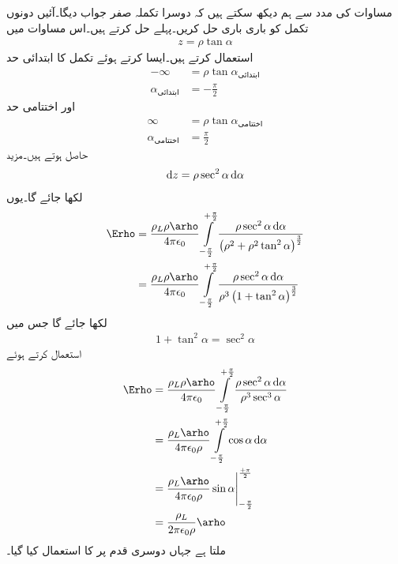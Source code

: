 مساوات  کی مدد سے ہم دیکھ سکتے ہیں کہ دوسرا تکملہ صفر جواب دیگا۔آئیں دونوں تکمل کو باری باری حل کریں۔پہلے \Erho حل کرتے ہیں۔اس مساوات میں
\begin{align*}
z=\rho \tan \alpha
\end{align*}
استعمال کرتے ہیں۔ایسا کرتے ہوئے تکمل کا ابتدائی حد 
\begin{align*}
-\infty &= \rho \tan \alpha_{\textrm{ابتدائی}}\\
\alpha_{\textrm{ابتدائی}} &= -\frac{\pi}{2}
\end{align*}
اور اختتامی حد
\begin{align*}
\infty &= \rho \tan \alpha_{\textrm{اختتامی}}\\
\alpha_{\textrm{اختتامی}} &= \frac{\pi}{2}
\end{align*}
حاصل ہوتے ہیں۔مزید
\begin{align*}
\dif z=\rho \sec^2 \alpha \dif \alpha
\end{align*}
لکھا جائے گا۔یوں
\begin{align*}
\Erho&=\frac{\rho_L \rho \arho}{4 \pi \epsilon_0}\int\limits_{-\frac{\pi}{2}}^{+\frac{\pi}{2}} \frac{\rho \sec^2 \alpha \dif \alpha}{\left(\rho^2+\rho^2 \tan^2 \alpha \right)^{\frac{3}{2}}}\\
&=\frac{\rho_L \rho \arho}{4 \pi \epsilon_0}\int\limits_{-\frac{\pi}{2}}^{+\frac{\pi}{2}} \frac{\rho \sec^2 \alpha \dif \alpha}{\rho^3 \left(1+ \tan^2 \alpha \right)^{\frac{3}{2}}}
\end{align*}
لکھا جائے گا جس میں
\begin{align*}
1+\tan^2 \alpha=\sec^2 \alpha
\end{align*}
استعمال کرتے ہوئے
\begin{gather}
\begin{aligned}\label{مساوات_کولمب_لامحدود_لکیر_رداسی_میدان}
\Erho&=\frac{\rho_L \rho \arho}{4 \pi \epsilon_0}\int\limits_{-\frac{\pi}{2}}^{+\frac{\pi}{2}} \frac{\rho \sec^2 \alpha \dif \alpha}{\rho^3 \sec^3 \alpha}\\
&=\frac{\rho_L  \arho}{4 \pi \epsilon_0 \rho}\int\limits_{-\frac{\pi}{2}}^{+\frac{\pi}{2}} \cos \alpha \dif \alpha\\
&=\frac{\rho_L  \arho}{4 \pi \epsilon_0 \rho} \eval{\sin \alpha}_{-\frac{\pi}{2}}^{\frac{+\pi}{2}}\\
&=\frac{\rho_L }{2 \pi \epsilon_0 \rho} \arho
\end{aligned}
\end{gather}
ملتا ہے جہاں دوسری  قدم پر  کا استعمال کیا گیا۔

